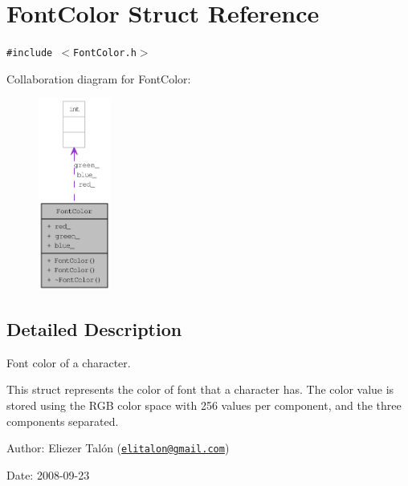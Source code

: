 \hypertarget{struct_font_color}{
\section{FontColor Struct Reference}
\label{struct_font_color}
}
{\tt \#include $<$FontColor.h$>$}

Collaboration diagram for FontColor:\nopagebreak
\begin{figure}[H]
\begin{center}
\leavevmode
\includegraphics[width=67pt]{struct_font_color__coll__graph}
\end{center}
\end{figure}


\subsection{Detailed Description}
Font color of a character. 

This struct represents the color of font that a character has. The color value is stored using the RGB color space with 256 values per component, and the three components separated.

\begin{Desc}
\item[Author:]Eliezer Talón (\href{mailto:elitalon@gmail.com}{\tt elitalon@gmail.com}) \end{Desc}
\begin{Desc}
\item[Date:]2008-09-23 \end{Desc}


